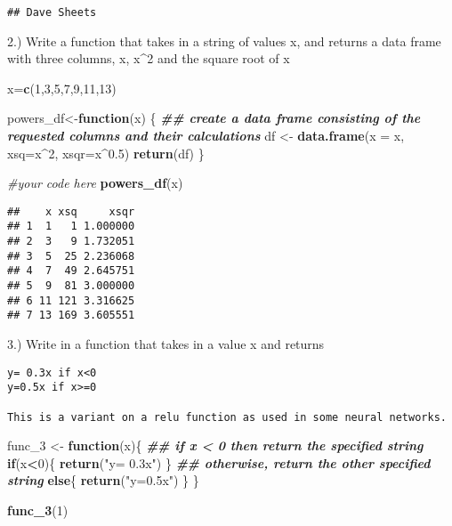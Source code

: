 \documentclass[
]{article}
\newenvironment{Shaded}{\begin{snugshade}}{\end{snugshade}}
\newcommand{\AttributeTok}[1]{\textcolor[rgb]{0.13,0.29,0.53}{#1}}
\newcommand{\CommentTok}[1]{\textcolor[rgb]{0.56,0.35,0.01}{\textit{#1}}}
\newcommand{\ControlFlowTok}[1]{\textcolor[rgb]{0.13,0.29,0.53}{\textbf{#1}}}
\newcommand{\DecValTok}[1]{\textcolor[rgb]{0.00,0.00,0.81}{#1}}
\newcommand{\DocumentationTok}[1]{\textcolor[rgb]{0.56,0.35,0.01}{\textbf{\textit{#1}}}}
\newcommand{\FloatTok}[1]{\textcolor[rgb]{0.00,0.00,0.81}{#1}}
\newcommand{\FunctionTok}[1]{\textcolor[rgb]{0.13,0.29,0.53}{\textbf{#1}}}
\newcommand{\NormalTok}[1]{#1}
\newcommand{\OtherTok}[1]{\textcolor[rgb]{0.56,0.35,0.01}{#1}}
\newcommand{\SpecialCharTok}[1]{\textcolor[rgb]{0.81,0.36,0.00}{\textbf{#1}}}
\newcommand{\StringTok}[1]{\textcolor[rgb]{0.31,0.60,0.02}{#1}}
\begin{document}
\begin{verbatim}
## Dave Sheets
\end{verbatim}

2.) Write a function that takes in a string of values x, and returns a
data frame with three columns, x, x\^{}2 and the square root of x

\begin{Shaded}
\begin{Highlighting}[]
\NormalTok{x}\OtherTok{=}\FunctionTok{c}\NormalTok{(}\DecValTok{1}\NormalTok{,}\DecValTok{3}\NormalTok{,}\DecValTok{5}\NormalTok{,}\DecValTok{7}\NormalTok{,}\DecValTok{9}\NormalTok{,}\DecValTok{11}\NormalTok{,}\DecValTok{13}\NormalTok{)}

\NormalTok{powers\_df}\OtherTok{\textless{}{-}}\ControlFlowTok{function}\NormalTok{(x)}
\NormalTok{\{}
  \DocumentationTok{\#\# create a data frame consisting of the requested columns and their calculations}
\NormalTok{  df }\OtherTok{\textless{}{-}} \FunctionTok{data.frame}\NormalTok{(}\AttributeTok{x =}\NormalTok{ x, }\AttributeTok{xsq=}\NormalTok{x}\SpecialCharTok{\^{}}\DecValTok{2}\NormalTok{, }\AttributeTok{xsqr=}\NormalTok{x}\SpecialCharTok{\^{}}\FloatTok{0.5}\NormalTok{)}
  \FunctionTok{return}\NormalTok{(df)}
\NormalTok{\}}

\CommentTok{\#your code here}
\FunctionTok{powers\_df}\NormalTok{(x)}
\end{Highlighting}
\end{Shaded}

\begin{verbatim}
##    x xsq     xsqr
## 1  1   1 1.000000
## 2  3   9 1.732051
## 3  5  25 2.236068
## 4  7  49 2.645751
## 5  9  81 3.000000
## 6 11 121 3.316625
## 7 13 169 3.605551
\end{verbatim}

3.) Write in a function that takes in a value x and returns

\begin{verbatim}
y= 0.3x if x<0
y=0.5x if x>=0

This is a variant on a relu function as used in some neural networks.
\end{verbatim}

\begin{Shaded}
\begin{Highlighting}[]
\NormalTok{func\_3 }\OtherTok{\textless{}{-}} \ControlFlowTok{function}\NormalTok{(x)\{}
  \DocumentationTok{\#\# if x \textless{} 0 then return the specified string}
  \ControlFlowTok{if}\NormalTok{(x}\SpecialCharTok{\textless{}}\DecValTok{0}\NormalTok{)\{}
    \FunctionTok{return}\NormalTok{(}\StringTok{"y= 0.3x"}\NormalTok{)}
\NormalTok{  \}}
  \DocumentationTok{\#\# otherwise, return the other specified string}
  \ControlFlowTok{else}\NormalTok{\{}
    \FunctionTok{return}\NormalTok{(}\StringTok{"y=0.5x"}\NormalTok{)}
\NormalTok{  \}}
\NormalTok{\}}

\FunctionTok{func\_3}\NormalTok{(}\DecValTok{1}\NormalTok{)}
\end{Highlighting}
\end{Shaded}
\end{document}
